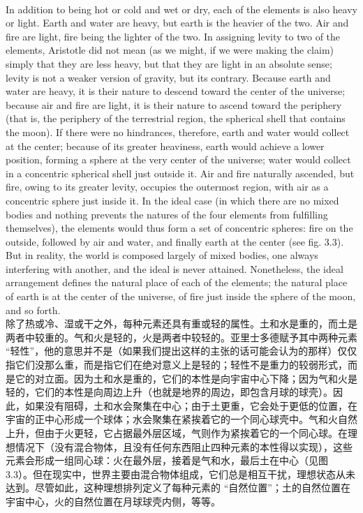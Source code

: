 \documentclass{article}
\begin{document}
\\
In addition to being hot or cold and wet or dry, each of the elements is also heavy or light. Earth and water are heavy, but earth is the heavier of the two. Air and fire are light, fire being the lighter of the two. In assigning levity to two of the elements, Aristotle did not mean (as we might, if we were making the claim) simply that they are less heavy, but that they are light in an absolute sense; levity is not a weaker version of gravity, but its contrary. Because earth and water are heavy, it is their nature to descend toward the center of the universe; because air and fire are light, it is their nature to ascend toward the periphery (that is, the periphery of the terrestrial region, the spherical shell that contains the moon). If there were no hindrances, therefore, earth and water would collect at the center; because of its greater heaviness, earth would achieve a lower position, forming a sphere at the very center of the universe; water would collect in a concentric spherical shell just outside it. Air and fire naturally ascended, but fire, owing to its greater levity, occupies the outermost region, with air as a concentric sphere just inside it. In the ideal case (in which there are no mixed bodies and nothing prevents the natures of the four elements from fulfilling themselves), the elements would thus form a set of concentric spheres: fire on the outside, followed by air and water, and finally earth at the center (see fig. 3.3). But in reality, the world is composed largely of mixed bodies, one always interfering with another, and the ideal is never attained. Nonetheless, the ideal arrangement defines the natural place of each of the elements; the natural place of earth is at the center of the universe, of fire just inside the sphere of the moon, and so forth.\\
除了热或冷、湿或干之外，每种元素还具有重或轻的属性。土和水是重的，而土是两者中较重的。气和火是轻的，火是两者中较轻的。亚里士多德赋予其中两种元素 “轻性”，他的意思并不是（如果我们提出这样的主张的话可能会认为的那样）仅仅指它们没那么重，而是指它们在绝对意义上是轻的；轻性不是重力的较弱形式，而是它的对立面。因为土和水是重的，它们的本性是向宇宙中心下降；因为气和火是轻的，它们的本性是向周边上升（也就是地界的周边，即包含月球的球壳）。因此，如果没有阻碍，土和水会聚集在中心；由于土更重，它会处于更低的位置，在宇宙的正中心形成一个球体；水会聚集在紧挨着它的一个同心球壳中。气和火自然上升，但由于火更轻，它占据最外层区域，气则作为紧挨着它的一个同心球。在理想情况下（没有混合物体，且没有任何东西阻止四种元素的本性得以实现），这些元素会形成一组同心球：火在最外层，接着是气和水，最后土在中心（见图 3.3）。但在现实中，世界主要由混合物体组成，它们总是相互干扰，理想状态从未达到。尽管如此，这种理想排列定义了每种元素的 “自然位置”；土的自然位置在宇宙中心，火的自然位置在月球球壳内侧，等等。\\
\end{document}
